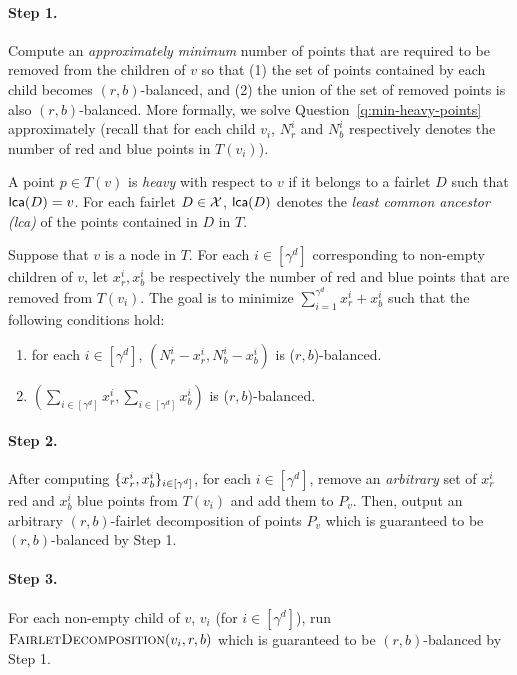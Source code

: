 \paragraph{Step 1.} Compute an {\em approximately minimum} number of points that are required to be removed from the children of $v$ so that (1) the set of points contained by each child becomes $(r,b)$-balanced, and (2) the union of the set of removed points is also $(r,b)$-balanced.  
More formally, we solve Question~\ref{q:min-heavy-points} approximately (recall that for each child $v_i$, $N^i_r$ and $N^i_b$ respectively denotes the number of red and blue points in $T(v_i)$).
\begin{definition}\label{def:heavy-points}
A point $p\in T(v)$ is {\em heavy} with respect to $v$ if it belongs to a fairlet $D$ such that $\textsf{lca}(D) = v$.
For each fairlet $D\in \mathcal{X}$, $\textsf{lca}(D)$ denotes the {\em least common ancestor (lca)} of the points contained in $D$ in $T$.
\end{definition}
\begin{question}\label{q:min-heavy-points}
Suppose that $v$ is a node in $T$. For each $i\in [\gamma^d]$ corresponding to non-empty children of $v$, let $x^i_r, x^i_b$ be respectively the number of red and blue points that are removed from $T(v_i)$. The goal is to minimize $\sum_{i=1}^{\gamma^d} x^i_r + x^i_b$ such that the following conditions hold:
\begin{enumerate}
	\item for each $i\in [\gamma^d]$, $(N^i_r - x^i_r, N^i_b - x^i_b)$ is ($r,b$)-balanced.
	\item $(\sum_{i\in[\gamma^d]} x^i_r, \sum_{i\in[\gamma^d]} x^i_b)$ is ($r,b$)-balanced.
\end{enumerate}
\end{question}

\paragraph{Step 2.} After computing $\{x^i_r, x^i_b\}_{i\in[\gamma^d]}$, for each $i\in [\gamma^d]$, remove an {\em arbitrary} set of $x^i_r$ red and $x^i_b$ blue points from $T(v_i)$ and add them to $P_v$. Then, output an arbitrary $(r,b)$-fairlet decomposition of points $P_v$ which is guaranteed to be $(r,b)$-balanced by Step 1. 

\paragraph{Step 3.} For each non-empty child of $v$, $v_i$ (for $i\in [\gamma^d]$), run $\Call{\fairletDec}{v_i, r, b}$ which is guaranteed to be $(r,b)$-balanced by Step 1. 

